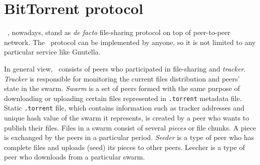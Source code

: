 

\section{BitTorrent protocol}
\bt~\cite{2003:bittorrent:cohen}, nowadays, stand as \textit{de facto} file-sharing protocol on top of peer-to-peer network. The \bt~protocol can be implemented by anyone, so it is not limited to any particular service like Gnutella.

In general view, \bt~consists of peers who participated in file-sharing and \textit{tracker}. \textit{Tracker} is responsible for monitoring the current files distribution and peers' state in the swarm. \textit{Swarm} is a set of peers formed with the same purpose of downloading or uploading certain files represented in \texttt{.torrent} metadata file. Static \texttt{.torrent} file, which contains information such as tracker addresses and unique hash value of the swarm it represents, is created by a peer who wants to publish their files. Files in a swarm consist of several \textit{pieces} or file chunks. A piece is exchanged by the peers in a particular period. \textit{Seeder} is a type of peer who has complete files and uploads (seed) its pieces to other peers. Leecher is a type of peer who downloads from a particular swarm.



